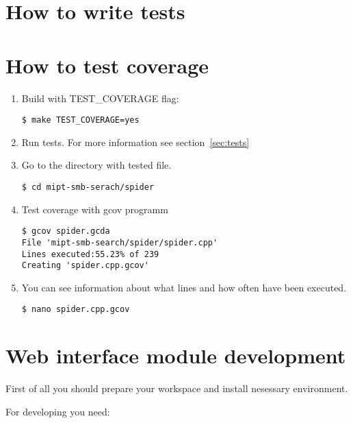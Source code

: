 \section{How to write tests}

\section{How to test coverage}

\begin{enumerate}

\item Build with TEST\_COVERAGE flag:
\begin{lstlisting}
$ make TEST_COVERAGE=yes
\end{lstlisting}

\item Run tests. For more information see section~\ref{sec:tests}

\item Go to the directory with tested file.
\begin{lstlisting}
$ cd mipt-smb-serach/spider
\end{lstlisting}

\item Test coverage with gcov programm
\begin{lstlisting}
$ gcov spider.gcda
File 'mipt-smb-search/spider/spider.cpp'
Lines executed:55.23% of 239
Creating 'spider.cpp.gcov'
\end{lstlisting}

\item You can see information about what lines and how often have been executed.
\begin{lstlisting}
$ nano spider.cpp.gcov
\end{lstlisting}

\end{enumerate}

\section{Web interface module development}

First of all you should prepare your workspace and install nesessary environment.

For developing you need:

